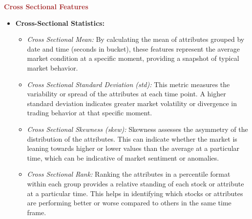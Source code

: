 \documentclass[12pt]{article}
\newtheorem{Proof of Lemma}{Proof of Lemma}
\begin{document}
\noindent \textcolor{brown}{\textbf{Cross Sectional Features}}

\begin{itemize}
  \item \textbf{Cross-Sectional Statistics:}
  \begin{itemize}
  \item \textit{Cross Sectional Mean:} By calculating the mean of attributes grouped by date and time (seconds in bucket), these features represent the average market condition at a specific moment, providing a snapshot of typical market behavior.
  \item \textit{Cross Sectional Standard Deviation (std):} This metric measures the variability or spread of the attributes at each time point. A higher standard deviation indicates greater market volatility or divergence in trading behavior at that specific moment.
  
  \item \textit{Cross Sectional Skewness (skew):} Skewness assesses the asymmetry of the distribution of the attributes. This can indicate whether the market is leaning towards higher or lower values than the average at a particular time, which can be indicative of market sentiment or anomalies.
  
  \item \textit{Cross Sectional Rank:} Ranking the attributes in a percentile format within each group provides a relative standing of each stock or attribute at a particular time. This helps in identifying which stocks or attributes are performing better or worse compared to others in the same time frame.
  \end{itemize}

\end{itemize}
\end{document}
